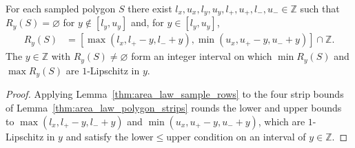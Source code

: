 \begin{lemma}
    \label{thm:area_law_affine_row_profiles}
    \leanok
    For each sampled polygon $S$ there exist $l_x,u_x,l_y,u_y,l_+,u_+,l_-,u_-\in\mathbb Z$ such that $R_y(S)=\varnothing$ for $y\notin[l_y,u_y]$ and, for $y\in[l_y,u_y]$,
    \begin{align}
        R_y(S) & =
        [\max(l_x,l_+-y,l_-+y),\min(u_x,u_+-y,u_-+y)]\cap\mathbb Z.
    \end{align}
    The $y\in\mathbb Z$ with $R_y(S)\ne\varnothing$ form an integer interval on which $\min R_y(S)$ and $\max R_y(S)$ are $1$-Lipschitz in $y$.
\end{lemma}
\begin{proof}
    \leanok
    Applying Lemma~\ref{thm:area_law_sample_rows} to the four strip bounds of Lemma~\ref{thm:area_law_polygon_strips} rounds the lower and upper bounds to $\max(l_x,l_+-y,l_-+y)$ and $\min(u_x,u_+-y,u_-+y)$, which are $1$-Lipschitz in $y$ and satisfy the lower$\le$upper condition on an interval of $y\in\mathbb Z$.
\end{proof}

